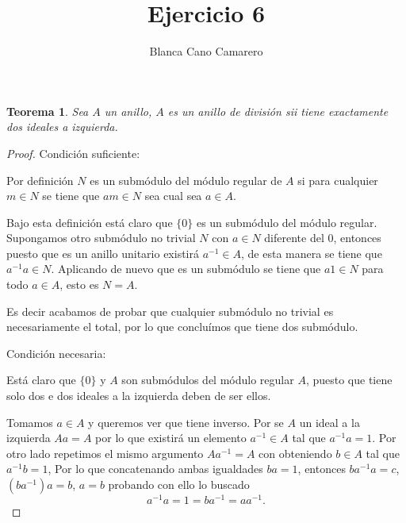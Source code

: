 \documentclass{article}
\title{Ejercicio 6}
\author{Blanca Cano Camarero}
\newtheorem*{teorema*}{Teorema}
\begin{document}
\maketitle

\begin{teorema*}
    Sea $A$ un anillo, $A$ es un anillo de división sii tiene exactamente dos ideales a izquierda. 
\end{teorema*}   
\begin{proof}
Condición suficiente: 

Por definición $N$ es un submódulo del módulo regular de $A$ si 
para cualquier $m\in N$ se tiene que $am \in N$ sea cual sea $a \in A$. 

Bajo esta definición está claro que $\{0\}$ es un submódulo del módulo regular. Supongamos otro submódulo no trivial $N$
con $a \in N$ diferente del $0$, entonces puesto que es un anillo unitario  existirá $a^{-1} \in A$, de esta manera se tiene que 
$a^{-1} a \in N.$
Aplicando de nuevo que es un submódulo se tiene que 
$a 1 \in N$ para todo $a \in A$, esto es $N=A$. 

Es decir acabamos de probar que cualquier submódulo no trivial es necesariamente el total, por lo que concluímos que tiene dos submódulo. 

Condición necesaria: 

Está claro que $\{0\}$ y $A$ son submódulos del módulo regular $A$, puesto que tiene solo dos e dos ideales a la izquierda deben de ser ellos.  

Tomamos $a \in A$ y queremos ver que tiene inverso. Por se $A$ 
un ideal a la izquierda 
$Aa = A$ por lo que existirá un elemento $a^{-1} \in A$ tal que 
$a^{-1} a = 1$. 
Por otro lado repetimos el mismo argumento $Aa^{-1} = A$ con  obteniendo $b \in A$ tal que $a^{-1}b = 1$,
Por lo que concatenando ambas igualdades
$ba=1$, entonces $ba^{-1}a=c$, $(ba^{-1})a=b$, $a = b$ probando con ello lo buscado
$$a^{-1}a = 1 = ba^{-1} =  a a^{-1}.$$
\end{proof}
\end{document}
